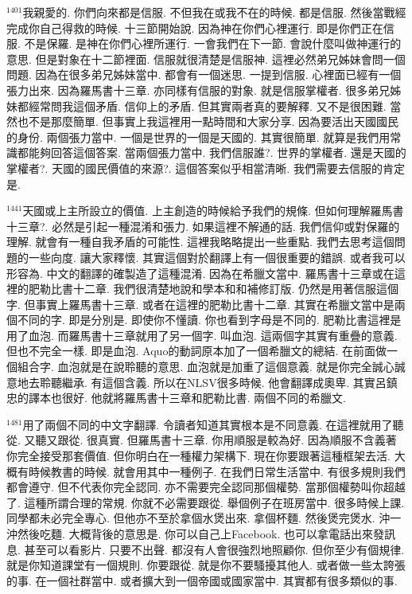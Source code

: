 \documentclass{book}
\begin{document}
$^{1401}$我親愛的.
你們向來都是信服.
不但我在或我不在的時候.
都是信服.
然後當戰經完成你自己得救的時候.
十三節開始說.
因為神在你們心裡運行.
即是你們正在信服.
不是保羅.
是神在你們心裡所運行.
一會我們在下一節.
會說什麼叫做神運行的意思.
但是對象在十二節裡面.
信服就很清楚是信服神.
這裡必然弟兄姊妹會問一個問題.
因為在很多弟兄姊妹當中.
都會有一個迷思.
一提到信服.
心裡面已經有一個張力出來.
因為羅馬書十三章.
亦同樣有信服的對象.
就是信服掌權者.
很多弟兄姊妹都經常問我這個矛盾.
信仰上的矛盾.
但其實兩者真的要解釋.
又不是很困難.
當然也不是那麼簡單.
但事實上我這裡用一點時間和大家分享.
因為要活出天國國民的身份.
兩個張力當中.
一個是世界的一個是天國的.
其實很簡單.
就算是我們用常識都能夠回答這個答案.
當兩個張力當中.
我們信服誰?.
世界的掌權者.
還是天國的掌權者?.
天國的國民價值的來源?.
這個答案似乎相當清晰.
我們需要去信服的肯定是.

$^{1441}$天國或上主所設立的價值.
上主創造的時候給予我們的規條.
但如何理解羅馬書十三章?.
必然是引起一種混淆和張力.
如果這裡不解通的話.
我們信仰或對保羅的理解.
就會有一種自我矛盾的可能性.
這裡我略略提出一些重點.
我們去思考這個問題的一些向度.
讓大家釋懷.
其實這個對於翻譯上有一個很重要的錯誤.
或者我可以形容為.
中文的翻譯的確製造了這種混淆.
因為在希臘文當中.
羅馬書十三章或在這裡的肥勒比書十二章.
我們很清楚地說和學本和和補修訂版.
仍然是用著信服這個字.
但事實上羅馬書十三章.
或者在這裡的肥勒比書十二章.
其實在希臘文當中是兩個不同的字.
即是分別是.
即使你不懂讀.
你也看到字母是不同的.
肥勒比書這裡是用了血泡.
而羅馬書十三章就用了另一個字.
叫血泡.
這兩個字其實有重疊的意義.
但也不完全一樣.
即是血泡.
Aquo的動詞原本加了一個希臘文的總結.
在前面做一個組合字.
血泡就是在說聆聽的意思.
血泡就是加重了這個意義.
就是你完全誠心誠意地去聆聽繼承.
有這個含義.
所以在NLSV很多時候.
他會翻譯成奧卑.
其實呂鎮忠的譯本也很好.
他就將羅馬書十三章和肥勒比書.
兩個不同的希臘文.

$^{1481}$用了兩個不同的中文字翻譯.
令讀者知道其實根本是不同意義.
在這裡就用了聽從.
又聽又跟從.
很真實.
但羅馬書十三章.
你用順服是較為好.
因為順服不含義著你完全接受那套價值.
但你明白在一種權力架構下.
現在你要跟著這種框架去活.
大概有時候教書的時候.
就會用其中一種例子.
在我們日常生活當中.
有很多規則我們都會遵守.
但不代表你完全認同.
亦不需要完全認同那個權勢.
當那個權勢叫你超越了.
這種所謂合理的常規.
你就不必需要跟從.
舉個例子在班房當中.
很多時候上課.
同學都未必完全專心.
但他亦不至於拿個水煲出來.
拿個杯麵.
然後煲完煲水.
沖一沖然後吃麵.
大概背後的意思是.
你可以自己上Facebook.
也可以拿電話出來發訊息.
甚至可以看影片.
只要不出聲.
都沒有人會很強烈地照顧你.
但你至少有個規律.
就是你知道課堂有一個規則.
你要跟從.
就是你不要騷擾其他人.
或者做一些太誇張的事.
在一個社群當中.
或者擴大到一個帝國或國家當中.
其實都有很多類似的事.
\end{document}
